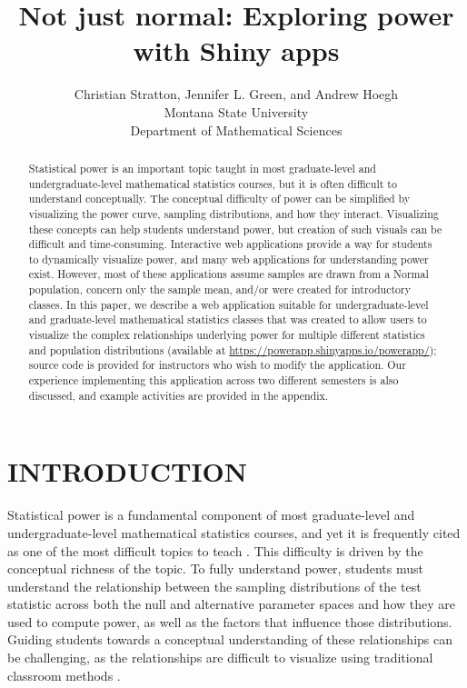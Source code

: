 \documentclass{TISE}
\title{Not just normal: Exploring power with Shiny apps}
\author{Christian Stratton, Jennifer L. Green, and Andrew Hoegh \\ Montana State University \\ Department of Mathematical Sciences}
\begin{document}
\pagestyle{plain}
\setcounter{page}{1}

\begin{abstract}
	Statistical power is an important topic taught in most graduate-level and undergraduate-level mathematical statistics courses, but it is often difficult to understand conceptually. The conceptual difficulty of power can be simplified by visualizing the power curve, sampling distributions, and how they interact. Visualizing these concepts can help students understand power, but creation of such visuals can be difficult and time-consuming. Interactive web applications provide a way for students to dynamically visualize power, and many web applications for understanding power exist. However, most of these applications assume samples are drawn from a Normal population, concern only the sample mean, and/or were created for introductory classes. In this paper, we describe a web application suitable for undergraduate-level and graduate-level mathematical statistics classes that was created to allow users to visualize the complex relationships underlying power for multiple different statistics and population distributions (available at \url{https://powerapp.shinyapps.io/powerapp/}); source code is provided for instructors who wish to modify the application. Our experience implementing this application across two different semesters is also discussed, and example activities are provided in the appendix.  
\end{abstract}
	
\section{INTRODUCTION}

Statistical power is a fundamental component of most graduate-level and undergraduate-level mathematical statistics courses, and yet it is frequently cited as one of the most difficult topics to teach \citep{aberson2002}. This difficulty is driven by the conceptual richness of the topic. To fully understand power, students must understand the relationship between the sampling distributions of the test statistic across both the null and alternative parameter spaces and how they are used to compute power, as well as the factors that influence those distributions. Guiding students towards a conceptual understanding of these relationships can be challenging, as the relationships are difficult to visualize using traditional classroom methods \citep{aberson2002}.
\end{document}
